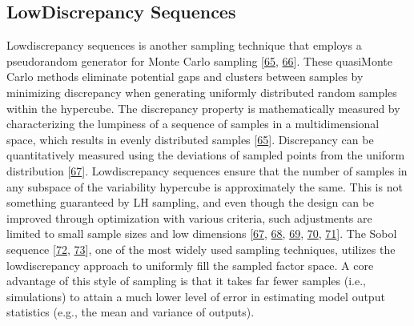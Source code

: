\documentclass[letterpaper,10pt,english]{sphinxmanual}
\begin{document}
\subsection{Low\sphinxhyphen{}Discrepancy Sequences}
\label{\detokenize{3_sensitivity_analysis_the_basics:low-discrepancy-sequences}}
\sphinxAtStartPar
Low\sphinxhyphen{}discrepancy sequences is another sampling technique that employs a pseudo\sphinxhyphen{}random generator for Monte Carlo sampling {[}\hyperlink{cite.index:id81}{65}, \hyperlink{cite.index:id92}{66}{]}. These quasi\sphinxhyphen{}Monte Carlo methods eliminate potential gaps and clusters between samples by minimizing discrepancy when generating uniformly distributed random samples within the hypercube. The discrepancy property is mathematically measured by characterizing the lumpiness of a sequence of samples in a multidimensional space, which results in evenly distributed samples {[}\hyperlink{cite.index:id81}{65}{]}. Discrepancy can be quantitatively measured using the deviations of sampled points from the uniform distribution {[}\hyperlink{cite.index:id95}{67}{]}. Low\sphinxhyphen{}discrepancy sequences ensure that the number of samples in any subspace of the variability hypercube is approximately the same. This is not something guaranteed by LH sampling, and even though the design can be improved through optimization with various criteria, such adjustments are limited to small sample sizes and low dimensions {[}\hyperlink{cite.index:id95}{67}, \hyperlink{cite.index:id93}{68}, \hyperlink{cite.index:id94}{69}, \hyperlink{cite.index:id96}{70}, \hyperlink{cite.index:id97}{71}{]}. The Sobol sequence {[}\hyperlink{cite.index:id98}{72}, \hyperlink{cite.index:id99}{73}{]}, one of the most widely used sampling techniques, utilizes the low\sphinxhyphen{}discrepancy approach to uniformly fill the sampled factor space. A core advantage of this style of sampling is that it takes far fewer samples (i.e., simulations) to attain a much lower level of error in estimating model output statistics (e.g., the mean and variance of outputs).
\end{document}
